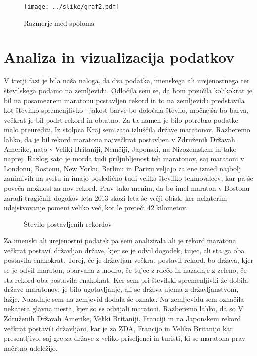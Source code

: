 \documentclass[11pt,a4paper]{article}
\begin{document}
\begin{figure}[H]
  \texttt{[image: ../slike/graf2.pdf]}
  \caption{Razmerje med spoloma}
  \label{fig:Slika 2}
\end{figure}

\newpage
\section{Analiza in vizualizacija podatkov}

V tretji fazi je bila naša naloga, da dva podatka, imenskega ali urejenostnega ter številskega podamo na zemljevidu. 
Odločila sem se, da bom preučila kolikokrat je bil na posameznem maratonu postavljen rekord in to na zemljevidu predstavila kot številko spremenjlivko - jakost barve bo določala število, močnejša bo barva, večkrat je bil podrt rekord in obratno. Za ta namen je bilo potrebno podatke malo preurediti. Iz stolpca Kraj sem zato izluščila države maratonov. 
Razberemo lahko, da je bil rekord maratona največkrat postavljen v Združenih Državah Amerike, nato v Veliki Britaniji, Nemčiji, Japonski, na Nizozemskem in tako naprej. Razlog zato je morda tudi priljubljenost teh maratonov, saj maratoni v Londonu, Bostonu, New Yorku, Berlinu in Parizu veljajo za ene izmed najbolj zanimivih na svetu in imajo posledično tudi veliko številko tekmovalcev, kar pa še poveča možnost za nov rekord. Prav tako menim, da bo imel maraton v Bostonu zaradi tragičnih dogokov leta 2013 skozi leta še večji obisk, ker nekaterim udejstvovanje pomeni veliko več, kot le preteči 42 kilometov.

\begin{figure}[H]
  \caption{Število postavljenih rekordov}
  \label{fig:Zemljevid 1}
\end{figure}

Za imenski ali urejenostni podatek pa sem analizirala ali je rekord maratona večkrat postavil državljan države, kjer se je odvil dogodek, tujec, ali sta ga oba postavila enakokrat. Torej, če je državljan večkrat postavil rekord, bo država, kjer se je odvil maraton, obarvana z modro, če tujec z rdečo in nazadnje z zeleno, če sta rekord oba postavila enakokrat.
Ker sem pri številski spremenljivki že dobila države maratonov, je bilo ugotavljanje, ali se država ujema z državljanstvom, lažje.
Nazadnje sem na zemjevid dodala še oznake. Na zemljevidu sem označila nekatera glavna mesta, kjer so se odvijali maratoni.
Razberemo lahko, da so V Združenih Državah Amerike, Veliki Britaniji, Franciji in na Japonskem rekord večkrat postavili državljani, kar je za ZDA, Francijo in Veliko Britanijo kar presentljivo, saj gre za države z veliko priseljenci in turisti, ki se maratona prav načrtno udeležijo. 
\end{document}
